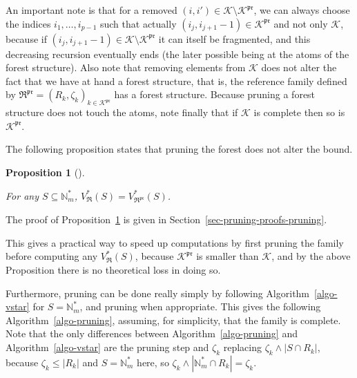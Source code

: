 \documentclass[
  11pt,
  a4paper,
]{article}
\theoremstyle{plain}
\newtheorem{proposition}{Proposition}[section]
\theoremstyle{plain}
\theoremstyle{definition}
\theoremstyle{plain}
\theoremstyle{definition}
\theoremstyle{remark}
\begin{document}
An important note is that for a removed
\((i,i')\in\mathcal{K}\setminus\mathcal{K}^{\mathfrak{pr}}\), we can
always choose the indices \(i_1,\dotsc,i_{p-1}\) such that actually
\((i_j,i_{j+1}-1)\in\mathcal{K}^{\mathfrak{pr}}\) and not only
\(\mathcal{K}\), because if
\((i_j,i_{j+1}-1)\in\mathcal{K}\setminus\mathcal{K}^{\mathfrak{pr}}\) it
can itself be fragmented, and this decreasing recursion eventually ends
(the later possible being at the atoms of the forest structure). Also
note that removing elements from \(\mathcal{K}\) does not alter the fact
that we have at hand a forest structure, that is, the reference family
defined by
\(\mathfrak{R}^{\mathfrak{pr}}=(R_k,\zeta_k)_{k\in\mathcal{K}^{\mathfrak{pr}}}\)
has a forest structure. Because pruning a forest structure does not
touch the atoms, note finally that if \(\mathcal{K}\) is complete then
so is \(\mathcal{K}^{\mathfrak{pr}}\).

The following proposition states that pruning the forest does not alter
the bound.

\begin{proposition}[]\protect\hypertarget{prp-pruning}{}\label{prp-pruning}

For any \(S\subseteq \mathbb{N}_m^*\),
\(V^*_{\mathfrak{R}}(S)=V^*_{\mathfrak{R}^{\mathfrak{pr}}}(S)\).

\end{proposition}

The proof of Proposition~\ref{prp-pruning} is given in
Section~\ref{sec-pruning-proofs-pruning}.

This gives a practical way to speed up computations by first pruning the
family before computing any \(V^*_{\mathfrak{R}}(S)\), because
\(\mathcal{K}^{\mathfrak{pr}}\) is smaller than \(\mathcal{K}\), and by
the above Proposition there is no theoretical loss in doing so.

Furthermore, pruning can be done really simply by following
Algorithm~\ref{algo-vstar} for \(S=\mathbb{N}_m^*\), and pruning when
appropriate. This gives the following Algorithm~\ref{algo-pruning},
assuming, for simplicity, that the family is complete. Note that the
only differences between Algorithm~\ref{algo-pruning} and
Algorithm~\ref{algo-vstar} are the pruning step and \(\zeta_k\)
replacing \(\zeta_k\wedge|S\cap R_k|\), because \(\zeta_k\leq|R_k|\) and
\(S=\mathbb{N}_m^*\) here, so
\(\zeta_k\wedge|\mathbb{N}_m^*\cap R_k|=\zeta_k\).
\end{document}
